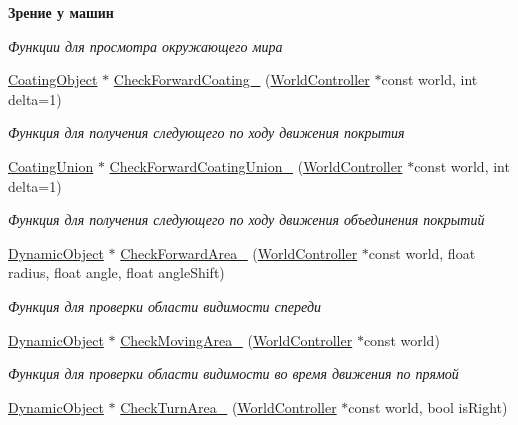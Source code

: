 \begin{Indent}\textbf{ Зрение у машин}\par
{\em Функции для просмотра окружающего мира }\begin{DoxyCompactItemize}
\item 
\hyperlink{classrtm_1_1_coating_object}{Coating\+Object} $\ast$ \hyperlink{classrtm_1_1_vehicle_object_a3756c9823f032ce8647343291fdbd00b}{Check\+Forward\+Coating\+\_\+} (\hyperlink{classrtm_1_1_world_controller}{World\+Controller} $\ast$const world, int delta=1)
\begin{DoxyCompactList}\small\item\em Функция для получения следующего по ходу движения покрытия \end{DoxyCompactList}\item 
\hyperlink{classrtm_1_1_coating_union}{Coating\+Union} $\ast$ \hyperlink{classrtm_1_1_vehicle_object_a96e80f98cc6aa50ab3f822e06223e345}{Check\+Forward\+Coating\+Union\+\_\+} (\hyperlink{classrtm_1_1_world_controller}{World\+Controller} $\ast$const world, int delta=1)
\begin{DoxyCompactList}\small\item\em Функция для получения следующего по ходу движения объединения покрытий \end{DoxyCompactList}\item 
\hyperlink{classrtm_1_1_dynamic_object}{Dynamic\+Object} $\ast$ \hyperlink{classrtm_1_1_vehicle_object_a2bc87b24a74b9eefc4e63d6618052c33}{Check\+Forward\+Area\+\_\+} (\hyperlink{classrtm_1_1_world_controller}{World\+Controller} $\ast$const world, float radius, float angle, float angle\+Shift)
\begin{DoxyCompactList}\small\item\em Функция для проверки области видимости спереди \end{DoxyCompactList}\item 
\hyperlink{classrtm_1_1_dynamic_object}{Dynamic\+Object} $\ast$ \hyperlink{classrtm_1_1_vehicle_object_a1c0c4467498e3b4a2d78c465a03fd32a}{Check\+Moving\+Area\+\_\+} (\hyperlink{classrtm_1_1_world_controller}{World\+Controller} $\ast$const world)
\begin{DoxyCompactList}\small\item\em Функция для проверки области видимости во время движения по прямой \end{DoxyCompactList}\item 
\hyperlink{classrtm_1_1_dynamic_object}{Dynamic\+Object} $\ast$ \hyperlink{classrtm_1_1_vehicle_object_a02526acf80a7bdf23f0b448a2f8b3e24}{Check\+Turn\+Area\+\_\+} (\hyperlink{classrtm_1_1_world_controller}{World\+Controller} $\ast$const world, bool is\+Right)

\end{DoxyCompactItemize}
\end{Indent}
